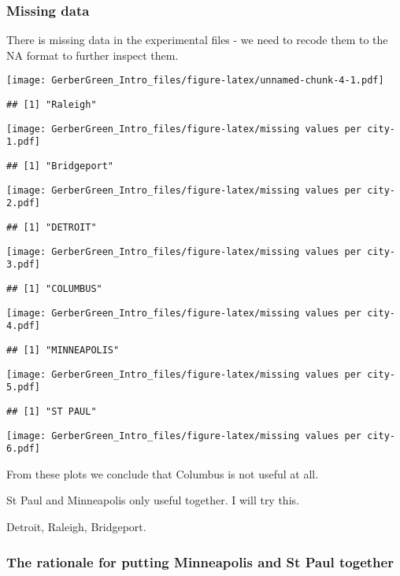 \documentclass[]{article}
\begin{document}
\subsubsection{Missing data}\label{missing-data}

There is missing data in the experimental files - we need to recode them
to the NA format to further inspect them.

\texttt{[image: GerberGreen\_Intro\_files/figure-latex/unnamed-chunk-4-1.pdf]}

\begin{verbatim}
## [1] "Raleigh"
\end{verbatim}

\texttt{[image: GerberGreen\_Intro\_files/figure-latex/missing values per city-1.pdf]}

\begin{verbatim}
## [1] "Bridgeport"
\end{verbatim}

\texttt{[image: GerberGreen\_Intro\_files/figure-latex/missing values per city-2.pdf]}

\begin{verbatim}
## [1] "DETROIT"
\end{verbatim}

\texttt{[image: GerberGreen\_Intro\_files/figure-latex/missing values per city-3.pdf]}

\begin{verbatim}
## [1] "COLUMBUS"
\end{verbatim}

\texttt{[image: GerberGreen\_Intro\_files/figure-latex/missing values per city-4.pdf]}

\begin{verbatim}
## [1] "MINNEAPOLIS"
\end{verbatim}

\texttt{[image: GerberGreen\_Intro\_files/figure-latex/missing values per city-5.pdf]}

\begin{verbatim}
## [1] "ST PAUL"
\end{verbatim}

\texttt{[image: GerberGreen\_Intro\_files/figure-latex/missing values per city-6.pdf]}

From these plots we conclude that Columbus is not useful at all.

St Paul and Minneapolis only useful together. I will try this.

Detroit, Raleigh, Bridgeport.

\subsubsection{The rationale for putting Minneapolis and St Paul
together}\label{the-rationale-for-putting-minneapolis-and-st-paul-together}
\end{document}
